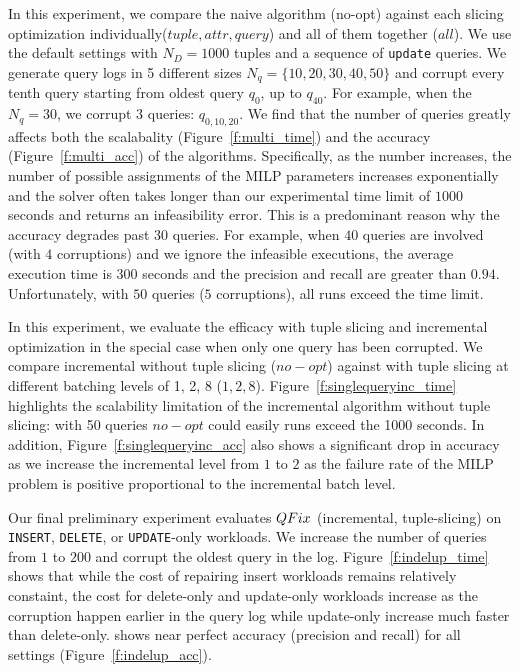 In this experiment, we compare the naive algorithm (no-opt) against 
each slicing optimization individually($tuple, attr, query$) and all of them together ($all$).  
We use the default settings with $N_D = 1000$ tuples and a sequence of \texttt{update} queries.
We generate query logs in 5 different sizes $N_q = \{10, 20, 30, 40, 50\}$ and corrupt 
every tenth query starting from oldest query $q_0$,
up to $q_{40}$.  For example, when the $N_q = {30}$, we corrupt 3 queries: $q_{0,10,20}$. 
We find that the number of queries greatly affects both the scalabality (Figure~\ref{f:multi_time}) 
and the accuracy (Figure~\ref{f:multi_acc}) of the algorithms. Specifically, as the number increases,
the number of possible assignments of the MILP parameters increases exponentially and the solver often takes
longer than our experimental time limit of $1000$ seconds and returns an infeasibility error.  
This is a predominant reason why the accuracy degrades past $30$ queries.  For example, 
when $40$ queries are involved (with $4$ corruptions) 
and we ignore the infeasible executions, the average execution time is $300$ seconds
and the precision and recall are greater than $0.94$.  Unfortunately, with $50$ queries ($5$ corruptions),
all runs exceed the time limit.

In this experiment, we evaluate the efficacy \sys with tuple slicing and incremental optimization
in the special case when only one query has been corrupted. We compare 
incremental without tuple slicing ($no-opt$) against with tuple slicing at 
different batching levels of 1, 2, 8 ($1,2,8$). 
Figure~\ref{f:singlequeryinc_time} highlights the scalability limitation of the incremental 
algorithm without tuple slicing: with 50 queries $no-opt$ could easily runs exceed the 1000 seconds.   
In addition, Figure~\ref{f:singlequeryinc_acc} also shows a significant drop in accuracy as we increase the incremental level from $1$ 
to $2$ as the failure rate of the MILP problem is positive proportional to the incremental batch level.


\label{sec:indelup}
Our final preliminary experiment evaluates 
$QFix$ (incremental, tuple-slicing) on \texttt{INSERT}, \texttt{DELETE}, or \texttt{UPDATE}-only workloads.
We increase the number of queries from $1$ to $200$ and corrupt the oldest query in the log.  
Figure~\ref{f:indelup_time} shows that while the cost of repairing insert workloads
remains relatively constaint, the cost for delete-only and update-only workloads increase as 
the corruption happen earlier in the query log while update-only increase much faster than delete-only.
\sys shows near perfect accuracy (precision and recall) for all settings (Figure~\ref{f:indelup_acc}).


